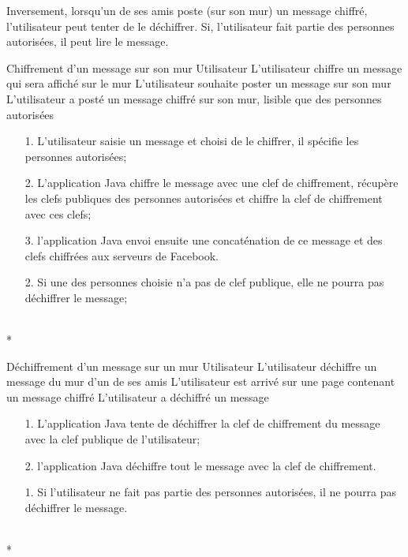 \documentclass[a4paper,11pt,french]{article}
\begin{document}
Inversement, lorsqu'un de ses amis poste (sur son mur) un message chiffré,
l'utilisateur peut tenter de le déchiffrer. Si, l'utilisateur
fait partie des personnes autorisées, il peut lire le message.


\fiche
	{Chiffrement d'un message sur son mur}
	{Utilisateur}
	{L'utilisateur chiffre un message qui sera affiché sur le mur}
	{}
	{L'utilisateur souhaite poster un message sur son mur}
	{L'utilisateur a posté un message chiffré sur son mur, lisible que des personnes autorisées}
	{\begin{itemize}
	    \item[]
	  \item[1.] L'utilisateur saisie un message et choisi de le chiffrer,
          il spécifie les personnes autorisées;
	\end{itemize}
	}
	{\begin{itemize}
        \item[]
		\item[2.] L'application Java chiffre le message avec une clef 
        de chiffrement, récupère les clefs publiques
        des personnes autorisées et chiffre la clef de chiffrement
        avec ces clefs;
		\item[3.] l'application Java envoi ensuite une concaténation de 
        ce message et des clefs chiffrées aux serveurs de Facebook.
	\end{itemize}
	}
	{}
\flots
    {\begin{itemize}
    \item[]
    \item[2.] Si une des personnes choisie n'a pas de clef publique,
        elle ne pourra pas déchiffrer le message;
    \end{itemize}
    }
	{}    
\\*

\fiche
	{Déchiffrement d'un message sur un mur}
	{Utilisateur}
	{L'utilisateur déchiffre un message du mur d'un de ses amis}
	{}
	{L'utilisateur est arrivé sur une page contenant un message chiffré}
	{L'utilisateur a déchiffré un message}
    {}
	{\begin{itemize}
        \item[]
		\item[1.] L'application Java tente de déchiffrer la clef de chiffrement
            du message avec la clef publique de l'utilisateur;
		\item[2.] l'application Java déchiffre tout le message avec la clef
            de chiffrement.
	\end{itemize}
	}
	{}
\flots
    {}
    {\begin{itemize}
    \item[]
    \item[1.] Si l'utilisateur ne fait pas partie des personnes
        autorisées, il ne pourra pas déchiffrer le message.
    \end{itemize}
    }
	{}    
\\*
\end{document}

